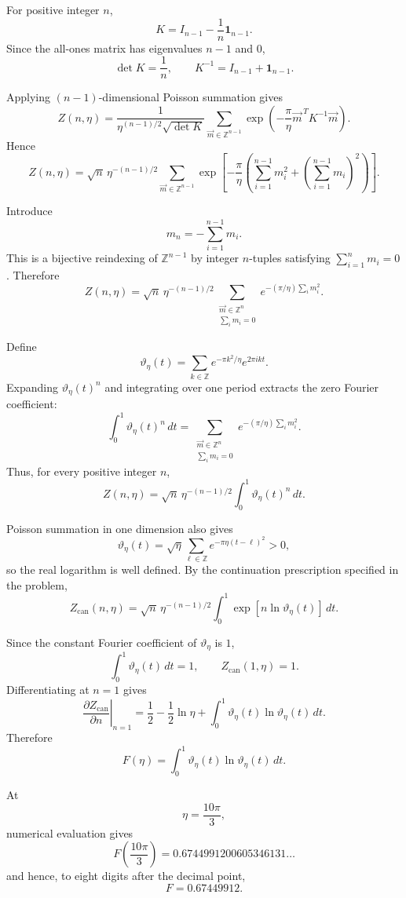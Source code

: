 
For positive integer \(n\),
\[
K
=
I_{n-1}-\frac{1}{n}\mathbf{1}_{n-1}.
\]
Since the all-ones matrix has eigenvalues \(n-1\) and \(0\),
\[
\det K=\frac{1}{n},
\qquad
K^{-1}=I_{n-1}+\mathbf{1}_{n-1}.
\]

Applying \((n-1)\)-dimensional Poisson summation gives
\[
Z(n,\eta)
=
\frac{1}{\eta^{(n-1)/2}\sqrt{\det K}}
\sum_{\vec m\in\mathbb Z^{n-1}}
\exp\!\left(
-\frac{\pi}{\eta}\vec m^{\,T}K^{-1}\vec m
\right).
\]
Hence
\[
Z(n,\eta)
=
\sqrt n\,\eta^{-(n-1)/2}
\sum_{\vec m\in\mathbb Z^{n-1}}
\exp\!\left[
-\frac{\pi}{\eta}
\left(
\sum_{i=1}^{n-1}m_i^2
+
\left(\sum_{i=1}^{n-1}m_i\right)^2
\right)
\right].
\]

Introduce
\[
m_n=-\sum_{i=1}^{n-1}m_i.
\]
This is a bijective reindexing of \(\mathbb Z^{n-1}\) by integer
\(n\)-tuples satisfying \(\sum_{i=1}^n m_i=0\). Therefore
\[
Z(n,\eta)
=
\sqrt n\,\eta^{-(n-1)/2}
\sum_{\substack{\vec m\in\mathbb Z^n\\ \sum_i m_i=0}}
e^{-(\pi/\eta)\sum_i m_i^2}.
\]

Define
\[
\vartheta_\eta(t)
=
\sum_{k\in\mathbb Z}
e^{-\pi k^2/\eta}e^{2\pi i k t}.
\]
Expanding \(\vartheta_\eta(t)^n\) and integrating over one period extracts
the zero Fourier coefficient:
\[
\int_0^1\vartheta_\eta(t)^n\,dt
=
\sum_{\substack{\vec m\in\mathbb Z^n\\ \sum_i m_i=0}}
e^{-(\pi/\eta)\sum_i m_i^2}.
\]
Thus, for every positive integer \(n\),
\[
Z(n,\eta)
=
\sqrt n\,\eta^{-(n-1)/2}
\int_0^1\vartheta_\eta(t)^n\,dt.
\]

Poisson summation in one dimension also gives
\[
\vartheta_\eta(t)
=
\sqrt{\eta}
\sum_{\ell\in\mathbb Z}
e^{-\pi\eta(t-\ell)^2}
>0,
\]
so the real logarithm is well defined. By the continuation prescription
specified in the problem,
\[
Z_{\mathrm{can}}(n,\eta)
=
\sqrt n\,\eta^{-(n-1)/2}
\int_0^1
\exp\!\left[n\ln\vartheta_\eta(t)\right]\,dt.
\]

Since the constant Fourier coefficient of \(\vartheta_\eta\) is \(1\),
\[
\int_0^1\vartheta_\eta(t)\,dt=1,
\qquad
Z_{\mathrm{can}}(1,\eta)=1.
\]
Differentiating at \(n=1\) gives
\[
\left.
\frac{\partial Z_{\mathrm{can}}}{\partial n}
\right|_{n=1}
=
\frac12-\frac12\ln\eta
+
\int_0^1
\vartheta_\eta(t)\ln\vartheta_\eta(t)\,dt.
\]
Therefore
\[
F(\eta)
=
\int_0^1
\vartheta_\eta(t)\ln\vartheta_\eta(t)\,dt.
\]

At
\[
\eta=\frac{10\pi}{3},
\]
numerical evaluation gives
\[
\boxed{
F\!\left(\frac{10\pi}{3}\right)
=
0.6744991200605346131\ldots
}
\]
and hence, to eight digits after the decimal point,
\[
\boxed{F=0.67449912}.
\]
